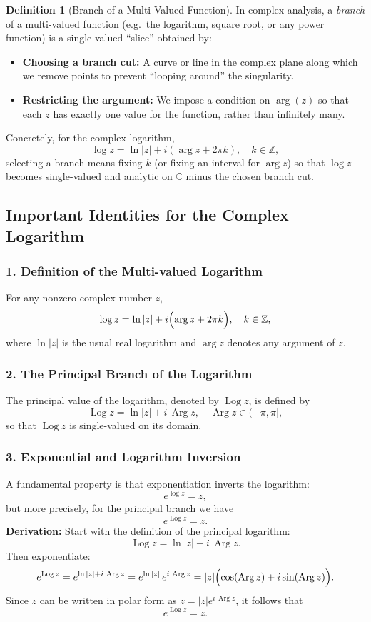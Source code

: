 \documentclass[12pt]{article}
\DeclareMathOperator{\Log}{Log}
\DeclareMathOperator{\Arg}{Arg}
\theoremstyle{definition} %
\newtheorem{definition}{Definition}
\theoremstyle{plain} %
\begin{document}
\begin{definition}[Branch of a Multi-Valued Function]

    In complex analysis, a \emph{branch} of a multi-valued function (e.g.\ the logarithm, square root, or any power function) is a single-valued “slice” obtained by:
    
    \begin{itemize}
      \item \textbf{Choosing a branch cut:} A curve or line in the complex plane along which we remove points to prevent “looping around” the singularity.
      \item \textbf{Restricting the argument:} We impose a condition on $\arg(z)$ so that each $z$ has exactly one value for the function, rather than infinitely many.
    \end{itemize}
    
    Concretely, for the complex logarithm,
    \[
    \log z = \ln|z| + i(\arg z + 2\pi k), \quad k \in \mathbb{Z},
    \]
    selecting a branch means fixing $k$ (or fixing an interval for $\arg z$) so that $\log z$ becomes single-valued and analytic on $\mathbb{C}$ minus the chosen branch cut.
      
\end{definition}
\subsection*{Important Identities for the Complex Logarithm}

\subsubsection*{1. Definition of the Multi-valued Logarithm}
For any nonzero complex number \(z\),
\[
\log z = \ln |z| + i\Bigl(\arg z + 2\pi k\Bigr), \quad k\in\mathbb{Z},
\]
where \(\ln|z|\) is the usual real logarithm and \(\arg z\) denotes any argument of \(z\).

\subsubsection*{2. The Principal Branch of the Logarithm}
The principal value of the logarithm, denoted by \(\Log z\), is defined by
\[
\Log z = \ln |z| + i\,\Arg z,\quad \Arg z\in (-\pi,\pi],
\]
so that \(\Log z\) is single-valued on its domain.

\subsubsection*{3. Exponential and Logarithm Inversion}
A fundamental property is that exponentiation inverts the logarithm:
\[
e^{\log z} = z,
\]
but more precisely, for the principal branch we have
\[
e^{\Log z} = z.
\]
\textbf{Derivation:}  
Start with the definition of the principal logarithm:
\[
\Log z = \ln|z| + i\,\Arg z.
\]
Then exponentiate:
\[
e^{\Log z} = e^{\ln|z| + i\,\Arg z} 
= e^{\ln|z|}\,e^{i\,\Arg z} 
= |z|\Bigl(\cos(\Arg z) + i\sin(\Arg z)\Bigr).
\]
Since \(z\) can be written in polar form as \(z = |z|e^{i\,\Arg z}\), it follows that
\[
e^{\Log z} = z.
\]
\end{document}
